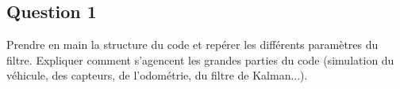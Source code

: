 \documentclass[../CSC_5RO12_TA_TP2.tex]{subfiles}
\begin{document}
\subsection{Question 1}

Prendre en main la structure du code et repérer les différents paramètres du filtre. Expliquer comment s'agencent les grandes parties du code (simulation du véhicule, des capteurs, de l'odométrie, du filtre de Kalman...).
\end{document}
